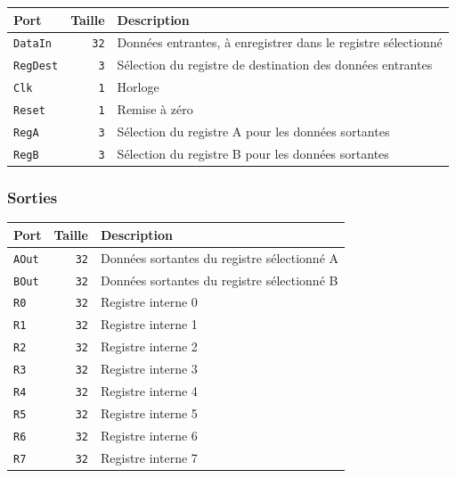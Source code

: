 \begin{tabular}{|l|r|l|}
\hline
\textbf{Port}		& \textbf{Taille} & \textbf{Description}\\
\hline

\texttt{DataIn}		& \texttt{32} & Données entrantes, à enregistrer dans le registre sélectionné\\
\hline
\texttt{RegDest}	&  \texttt{3} & Sélection du registre de destination des données entrantes\\
\hline
\texttt{Clk}		&  \texttt{1} & Horloge\\
\hline
\texttt{Reset}		&  \texttt{1} & Remise à zéro\\
\hline
\texttt{RegA}		&  \texttt{3} & Sélection du registre A pour les données sortantes\\
\hline
\texttt{RegB}		&  \texttt{3} & Sélection du registre B pour les données sortantes\\

\hline
\end{tabular}


\subsubsection{Sorties}

\begin{tabular}{|l|r|l|}
\hline 
\textbf{Port} & \textbf{Taille} & \textbf{Description}\\
\hline

\texttt{AOut}	& \texttt{32} & Données sortantes du registre sélectionné A\\
\hline
\texttt{BOut}	& \texttt{32} & Données sortantes du registre sélectionné B\\
\hline
\texttt{R0}	& \texttt{32} & Registre interne 0\\
\hline
\texttt{R1}	& \texttt{32} & Registre interne 1\\
\hline
\texttt{R2}	& \texttt{32} & Registre interne 2\\
\hline
\texttt{R3}	& \texttt{32} & Registre interne 3\\
\hline
\texttt{R4}	& \texttt{32} & Registre interne 4\\
\hline
\texttt{R5}	& \texttt{32} & Registre interne 5\\
\hline
\texttt{R6}	& \texttt{32} & Registre interne 6\\
\hline
\texttt{R7}	& \texttt{32} & Registre interne 7\\

\hline
\end{tabular}

